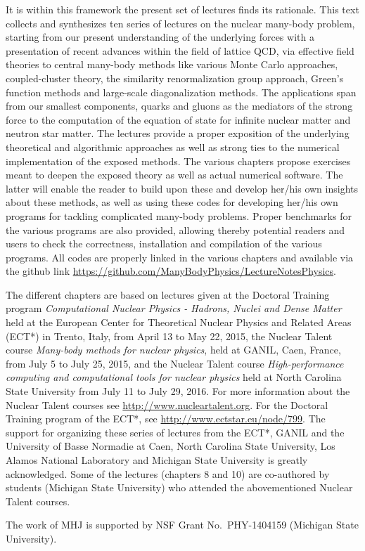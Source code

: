 It is within this framework the present set of lectures finds its rationale.
This text collects and synthesizes ten series of lectures on the
nuclear many-body problem, starting from our present understanding of
the underlying forces with a presentation of recent advances within
the field of lattice QCD, via effective field theories to central
many-body methods like various Monte Carlo approaches, coupled-cluster
theory, the similarity renormalization group approach, Green's
function methods and large-scale diagonalization methods.  The
applications span from our smallest components, quarks and gluons as
the mediators of the strong force to the computation of the equation
of state for infinite nuclear matter and neutron star matter.  The
lectures provide a proper exposition of the underlying theoretical and
algorithmic approaches as well as strong ties to the numerical
implementation of the exposed methods.  The various chapters propose
exercises meant to deepen the exposed theory as well as  actual numerical software.
The latter will enable the reader to build upon these and develop
her/his own insights about these methods, as well as using these codes
for developing her/his own programs for tackling complicated many-body
problems.  Proper benchmarks for the various programs are also provided, allowing thereby potential readers and users to check the 
correctness, installation and compilation  of the various programs. All codes are properly linked in the various chapters and available via the github link \url{https://github.com/ManyBodyPhysics/LectureNotesPhysics}. 


\begin{acknowledgement}
The different chapters are based on lectures given at the Doctoral Training program {\em Computational Nuclear Physics - Hadrons, Nuclei and Dense Matter} held at  the European Center for Theoretical Nuclear Physics
and Related Areas (ECT*) in Trento, Italy, from April 13 to May 22, 2015, the Nuclear Talent course {\em Many-body methods for nuclear physics}, held at GANIL, Caen, France, from July 5 to July 25,  2015, and the Nuclear Talent course {\em High-performance computing and computational tools for nuclear physics} held at North Carolina State University from July 11 to July 29, 2016. For more information about the Nuclear Talent courses see \url{http://www.nucleartalent.org}. For the Doctoral Training program of the ECT*, see \url{http://www.ectstar.eu/node/799}.
The support for organizing these series of lectures from the ECT*, GANIL and the University of Basse Normadie at Caen, North Carolina State University, Los Alamos National Laboratory and Michigan State University is greatly acknowledged.   Some of the lectures (chapters 8 and 10) are co-authored by students (Michigan State University) who  attended the abovementioned Nuclear Talent courses.


The work of MHJ is supported by NSF Grant No.~PHY-1404159 (Michigan State University). 
\end{acknowledgement}

%
%
